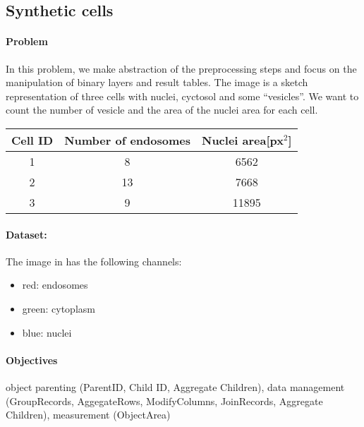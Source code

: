 \subsection{Synthetic cells}

\paragraph{Problem}
In this problem, we make abstraction of the preprocessing steps and focus on the manipulation of binary layers and result tables. The image is a sketch representation of three cells with nuclei, cyctosol and some  ``vesicles''. We want to count the number of vesicle and the area of the nuclei area for each cell.

\begin{center}
\begin{tabular}{ccc}
    Cell ID& Number of endosomes& Nuclei area[px$^2$]\\\hline
    1&8&6562\\
    2&13&7668\\
    3&9&11895\\
\end{tabular}   
\end{center}

\paragraph{Dataset:} The image in  has the following channels:
\begin{itemize}\itemsep0em
    \item red: endosomes
    \item green: cytoplasm
    \item blue: nuclei
\end{itemize}

\paragraph{Objectives} object parenting (ParentID, Child ID, Aggregate Children), data management (GroupRecords, AggegateRows, ModifyColumns, JoinRecords, Aggregate Children), measurement (ObjectArea)


